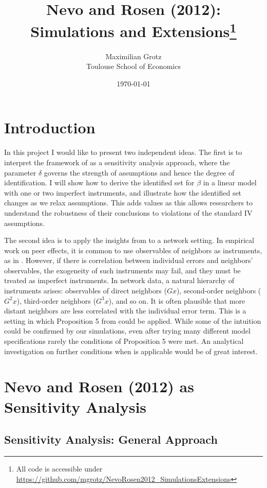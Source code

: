 \documentclass[12pt]{article}
\title{Nevo and Rosen (2012): Simulations and Extensions\footnote{All code is accessible under \url{https://github.com/mgrotz/NevoRosen2012_SimulationsExtensions}}}
\author{Maximilian Grotz\\Toulouse School of Economics}
\date{\today}
\begin{document}
\maketitle

\section{Introduction}

In this project I would like to present two independent ideas. The first is to interpret the framework of \textcite{nevo2012} as a sensitivity analysis approach, where the parameter $\delta$ governs the strength of assumptions and hence the degree of identification. I will show how to derive the identified set for $\beta$ in a linear model with one or two imperfect instruments, and illustrate how the identified set changes as we relax assumptions. This adds values as this allows researchers to understand the robustness of their conclusions to violations of the standard IV assumptions.

The second idea is to apply the insights from \textcite{nevo2012} to a network setting. In empirical work on peer effects, it is common to use observables of neighbors as instruments, as in \cite{bramoulle2009identification}. However, if there is correlation between individual errors and neighbors' observables, the exogeneity of such instruments may fail, and they must be treated as imperfect instruments. In network data, a natural hierarchy of instruments arises: observables of direct neighbors ($Gx$), second-order neighbors ($G^2 x$), third-order neighbors ($G^3 x$), and so on. It is often plausible that more distant neighbors are less correlated with the individual error term. This is a setting in which Proposition 5 from \textcite{nevo2012} could be applied. While some of the intuition could be confirmed by our simulations, even after trying many different model specifications rarely the conditions of Proposition 5 were met. An analytical investigation on further conditions when \textcite{nevo2012} is applicable would be of great interest.

\section{ Nevo and Rosen (2012) as Sensitivity Analysis}

\subsection{Sensitivity Analysis: General Approach}
\end{document}
